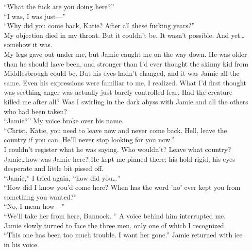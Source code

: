 \documentclass[a5paper]{scrartcl}
\begin{document}
\enquote{What the fuck are you doing here?}\\


\enquote{I was, I was just---}\\


\enquote{Why did you come back, Katie? After all these fucking years?}\\


My objection died in my throat. But it couldn't be. It wasn't possible. And yet\dots somehow it was.\\


My legs gave out under me, but Jamie caught me on the way down. He was older than he should have been, and stronger than I'd ever thought the skinny kid from Middlesbrough could be. But his eyes hadn't changed, and it was Jamie all the same. Even his expressions were familiar to me, I realized. What I'd first thought was seething anger was actually just barely controlled fear. Had the creature killed me after all? Was I swirling in the dark abyss with Jamie and all the others who had been taken?\\


\enquote{Jamie?} My voice broke over his name.\\


\enquote{Christ, Katie, you need to leave now and never come back. Hell, leave the country if you can. He'll never stop looking for you now.}\\


I couldn't register what he was saying. Who wouldn't? Leave what country? Jamie\dots how was Jamie here? He kept me pinned there; his hold rigid, his eyes desperate and little bit pissed off.\\


\enquote{Jamie,} I tried again, \enquote{how did you\dots }\\


\enquote{How did I know you'd come here? When has the word 'no' ever kept you from something you wanted?}\\


\enquote{No, I mean how---}\\


\enquote{We'll take her from here, Bannock. } A voice behind him interrupted me. \\


Jamie slowly turned to face the three men, only one of which I recognized.\\


\enquote{This one has been too much trouble. I want her gone.} Jamie returned with ice in his voice.\\
\end{document}
